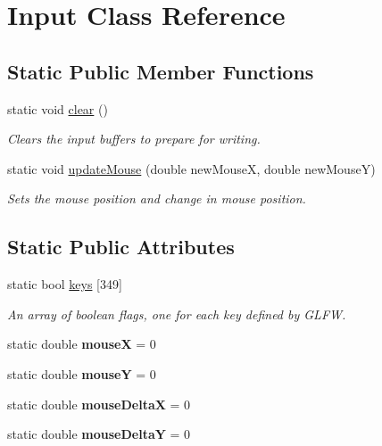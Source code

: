 \hypertarget{class_input}{\section{Input Class Reference}
\label{class_input}
}
\subsection*{Static Public Member Functions}
\begin{DoxyCompactItemize}
\item 
\hypertarget{class_input_a137d26e571405f42b63c955958fd7c92}{static void \hyperlink{class_input_a137d26e571405f42b63c955958fd7c92}{clear} ()}\label{class_input_a137d26e571405f42b63c955958fd7c92}

\begin{DoxyCompactList}\small\item\em Clears the input buffers to prepare for writing. \end{DoxyCompactList}\item 
static void \hyperlink{class_input_af6bcab8c1b438b9148381e50ef60e924}{update\-Mouse} (double new\-Mouse\-X, double new\-Mouse\-Y)
\begin{DoxyCompactList}\small\item\em Sets the mouse position and change in mouse position. \end{DoxyCompactList}\end{DoxyCompactItemize}
\subsection*{Static Public Attributes}
\begin{DoxyCompactItemize}
\item 
static bool \hyperlink{class_input_ae8198f96ea40f91fe9b910133a877959}{keys} \mbox{[}349\mbox{]}
\begin{DoxyCompactList}\small\item\em An array of boolean flags, one for each key defined by G\-L\-F\-W. \end{DoxyCompactList}\item 
\hypertarget{class_input_ac037722a59886e511544f858a0b7b4ed}{static double {\bfseries mouse\-X} = 0}\label{class_input_ac037722a59886e511544f858a0b7b4ed}

\item 
\hypertarget{class_input_afc8b383eee676dc3fa03a0f93e4ec106}{static double {\bfseries mouse\-Y} = 0}\label{class_input_afc8b383eee676dc3fa03a0f93e4ec106}

\item 
\hypertarget{class_input_acfbd3db4dd89f2e58b1ee8bc793b69d5}{static double {\bfseries mouse\-Delta\-X} = 0}\label{class_input_acfbd3db4dd89f2e58b1ee8bc793b69d5}

\item 
\hypertarget{class_input_a17cf4626f1454c1ef6d8468983a2188d}{static double {\bfseries mouse\-Delta\-Y} = 0}\label{class_input_a17cf4626f1454c1ef6d8468983a2188d}

\end{DoxyCompactItemize}


